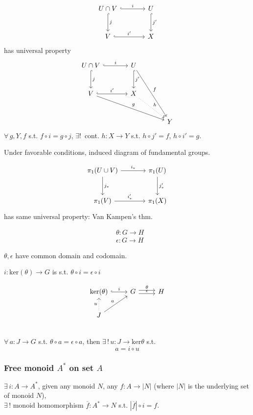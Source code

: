 \documentclass[10pt]{amsart}
\begin{document}
\begin{multicols*}{2}
\[
\begin{tikzcd}[sep=large] 
	U \cap V \arrow[r, hook, "i"] \arrow[d, hook, "j"] & U \arrow[d, hook, "j'"] \\
	V \arrow[r, hook, "i'"] & X
\end{tikzcd}
\]
has universal property
\[
\begin{tikzcd}[sep=large] 
U \cap V \arrow[r, hook, "i"] \arrow[d, hook, "j"] & U \arrow[d, hook, "j'"] \arrow[ddr, "f"] & \\
V \arrow[r, hook, "i'"] \arrow[drr, "g"] & X \arrow[dr, dotted, "h"] & \\
& & Y 
\end{tikzcd}
\]
$\forall \, g, Y, f$ s.t. $f\circ i = g\circ j$, $\exists ! \, $ cont. $h: X\to Y$ s.t. $h\circ j' = f$, $h\circ i' = g$.

Under favorable conditions, induced diagram of fundamental groups.

\[
\begin{tikzcd}[sep=large] 
\pi_1(U \cup V) \arrow[r, "i_*"] \arrow[d, "j_*"] & \pi_1(U) \arrow[d, "j'_*"] \\
\pi_1(V) \arrow[r, "i'_*"] & \pi_1(X)
\end{tikzcd}
\]
has same universal property: Van Kampen's thm.

\[
\begin{aligned}
& \theta : G \to H \\ 
& \epsilon : G \to H
\end{aligned}
\]

$\theta, \epsilon$ have common domain and codomain.

$i: \text{ker}(\theta) \to G$ is s.t. $\theta \circ i = \epsilon \circ i$

\[
\begin{tikzcd}
\text{ker}{(\theta)} \arrow[r, hook, "i"] & G \arrow[r, shift left, "\theta"] \arrow[r, shift right, "\epsilon"]& H \\
J \arrow[u, dotted, "u"] \arrow[ur, "a"] & & \\
\end{tikzcd}
\]
$\forall \, a : J \to G$ s.t. $\theta \circ a = \epsilon \circ a$, then $\exists \, ! \, u : J \to \text{ker}{\theta}$ s.t. 
\[
a = i \circ u 
\]

\subsubsection{Free monoid $A^*$ on set $A$}

$\exists \, i : A \to A^*$, given any monoid $N$, any $f: A \to |N|$ (where $|N|$ is the underlying set of monoid $N$), \\
$\exists \, ! $ monoid homomorphism $\overline{f}: A^* \to N$ s.t. $|\overline{f}| \circ i = f$.



\end{multicols*}
\end{document}
